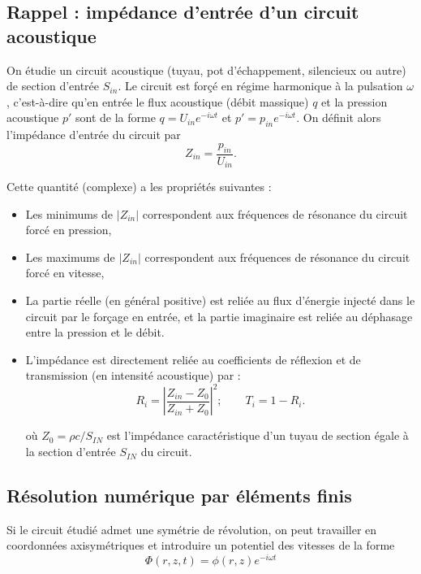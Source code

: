 \documentclass[11pt,a4paper]{article}
\begin{document}

\subsection{Rappel : impédance d'entrée d'un circuit acoustique}

On étudie un circuit acoustique (tuyau, pot d'échappement, silencieux ou autre) de section d'entrée $S_{in}$. Le circuit est forçé en régime harmonique à la pulsation $\omega$, c'est-à-dire qu'en 
entrée le flux acoustique (débit massique) $q$ et la pression acoustique $p'$ 
sont de la forme $q = U_{in}e^{-i \omega t}$ et $p' = p_{in} e^{-i \omega t}$. On définit alors l'impédance d'entrée du circuit par 
$$
Z_{in} = \frac{p_{in} }{U_{in}} . 
$$

Cette quantité (complexe) a les propriétés suivantes :

\begin{itemize}

\item Les minimums de $|Z_{in}|$ correspondent aux fréquences de résonance du circuit forcé en pression, 

\item Les maximums de $|Z_{in}|$ correspondent aux fréquences de résonance 
du circuit forcé en vitesse, 

\item La partie réelle (en général positive) est reliée au flux d'énergie injecté dans le circuit par le forçage en entrée, et la partie imaginaire est reliée au déphasage entre la pression et le débit.

\item L'impédance est directement reliée au coefficients de réflexion et de transmission (en intensité acoustique) par :
$$
R_i = \left|  \frac{ Z_{in} - Z_0}{Z_{in} + Z_0}  \right|^2 ; \qquad 
T_i = 1- R_i.
$$  

où $Z_0 = \rho c/S_{IN}$ est l'impédance caractéristique d'un tuyau de section égale à la section d'entrée $S_{IN}$ du circuit.

\end{itemize}

\subsection{Résolution numérique par éléments finis}

Si le circuit étudié admet une symétrie de révolution, on peut travailler en coordonnées axisymétriques et introduire un potentiel des vitesses de la forme  
$$
\Phi(r,z,t) = \phi(r,z) e^{-i \omega t}
$$
\end{document}
